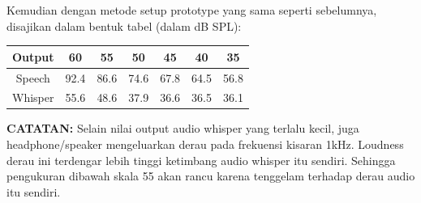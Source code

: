 \documentclass[12pt,]{article}
\begin{document}
	Kemudian dengan metode setup prototype yang sama seperti sebelumnya,
	disajikan dalam bentuk tabel (dalam dB SPL):
	\begin{center}
		\begin{tabular}{|c|c|c|c|c|c|c|}
			\hline
			Output & 60 & 55 & 50 & 45 & 40 & 35\\ [0.5ex]
			\hline\hline
			Speech & 92.4 & 86.6 & 74.6 & 67.8 & 64.5 & 56.8 \\
			\hline
			Whisper & 55.6 & 48.6 & 37.9 & 36.6 & 36.5 & 36.1 \\
			\hline
		\end{tabular}
	\end{center}

	\color{red} \textbf{CATATAN:}
	Selain nilai output audio whisper yang terlalu kecil,
	juga headphone/speaker mengeluarkan derau pada frekuensi kisaran 1kHz.
	Loudness derau ini terdengar lebih tinggi ketimbang audio whisper itu sendiri.
	Sehingga pengukuran dibawah skala 55 akan rancu karena tenggelam terhadap derau audio itu sendiri.
\end{document}
